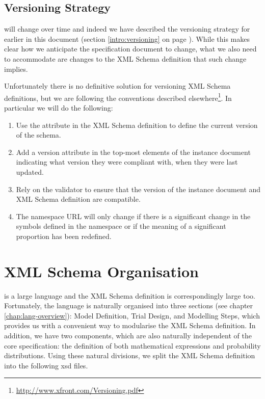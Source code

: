 \subsection{Versioning Strategy}

\pharmml will change over time and indeed we have described the
versioning strategy for \pharmml earlier in this document (section
\ref{intro:versioning} on page \pageref{intro:versioning}). While this
makes clear how we anticipate the specification document to change,
what we also need to accommodate are changes to the XML Schema
definition that such change implies.

Unfortunately there is no definitive solution for versioning XML
Schema definitions, but we are following the conventions described
elsewhere\footnote{\url{http://www.xfront.com/Versioning.pdf}}. In particular we
will do the following:
\begin{enumerate}
\item Use the  attribute in the XML Schema definition to
  define the current version of the schema.
\item Add a version attribute in the top-most elements of the instance
  document indicating what version they were compliant with, when they
  were last updated.
\item Rely on the \pharmml validator to ensure that the version of the
  instance document and XML Schema definition are compatible.
\item The namespace URL will only change if there is a significant
  change in the symbols defined in the namespace or if the meaning of
  a significant proportion has been redefined.
\end{enumerate}

\section{XML Schema Organisation}

\pharmml is a large language and the XML Schema definition is
correspondingly large too. Fortunately, the language is naturally
organised into three sections (see chapter
\ref{chap:lang-overview}): Model Definition, Trial Design, and
Modelling Steps, which provides us with a convenient way to modularise
the XML Schema definition. In addition, we have two components, which
are also naturally independent of the core \pharmml specification: the
definition of both mathematical expressions and probability
distributions. Using these natural divisions, we split the \pharmml XML Schema
definition into the following xsd files.

